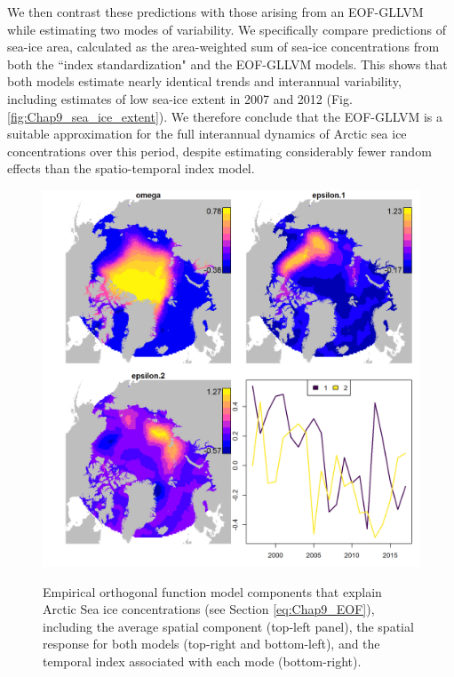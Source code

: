 We then contrast these predictions with those arising from an EOF-GLLVM while estimating two modes of variability.  We specifically compare predictions of sea-ice area, calculated as the area-weighted sum of sea-ice concentrations from both the ``index standardization" and the EOF-GLLVM models.  This shows that both models estimate nearly identical trends and interannual variability, including estimates of low sea-ice extent in 2007 and 2012 (Fig. \ref{fig:Chap9_sea_ice_extent}).  We therefore conclude that the EOF-GLLVM is a suitable approximation for the full interannual dynamics of Arctic sea ice concentrations over this period, despite estimating considerably fewer random effects than the spatio-temporal index model.  

\begin{figure}[!ht]
    \caption[Empirical orthogonal function for Arctic sea ice concentrations]{Empirical orthogonal function model components that explain Arctic Sea ice concentrations (see Section \ref{eq:Chap9_EOF}), including the average spatial component (top-left panel), the spatial response for both models (top-right and bottom-left), and the temporal index associated with each mode (bottom-right).}
    \centering
    \includegraphics[width=5.5in]{Chap_9/EOF=2.png}
    \label{fig:Chap9_EOF=2}
\end{figure}

